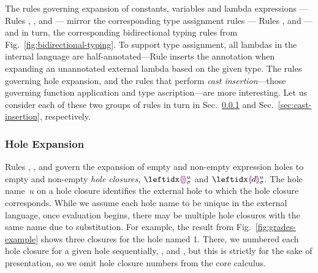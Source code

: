 The rules governing expansion of constants, variables and lambda expressions
--- Rules , ,  and 
--- mirror the corresponding type assignment rules
--- Rules ,  and 
--- and in turn, the corresponding bidirectional typing rules from Fig.~\ref{fig:bidirectional-typing}.
%
%
To support type assignment, all lambdas in the internal language are
half-annotated---Rule  inserts the annotation when expanding an
unannotated external lambda based on the given type.
%
The rules governing hole expansion, and the rules that perform \emph{cast insertion}---those governing
function application and type ascription---are more interesting. Let us consider each of these two groups of rules in turn in Sec.~\ref{sec:hole-expansion} and Sec.~\ref{sec:cast-insertion}, respectively.

\subsubsection{Hole Expansion}\label{sec:hole-expansion}
Rules , ,  and  govern the expansion of empty and non-empty expression holes to empty and non-empty \emph{hole closures}, $\dehole{u}{\sigma}{}$ and $\dhole{\dexp}{u}{\sigma}{}$.
%
The hole name~$u$ on a hole closure identifies the external hole to which the hole closure corresponds.
%
While we assume each hole name to be unique in the external language, once evaluation begins, there may be multiple hole closures with the same name due to substitution.
%
For example, the result from Fig.~\ref{fig:grades-example} shows three closures for the hole named 1.
%
There, we numbered each hole closure for a given hole sequentially, ,  and , but this is strictly for the sake of presentation, so we omit hole closure numbers from the core calculus.

